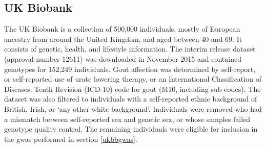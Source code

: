\documentclass[twoside,openright]{report}
\newenvironment{Shaded}{\begin{snugshade}}{\end{snugshade}}
\newcommand{\KeywordTok}[1]{\textcolor[rgb]{0.13,0.29,0.53}{\textbf{#1}}}
\newcommand{\StringTok}[1]{\textcolor[rgb]{0.31,0.60,0.02}{#1}}
\newcommand{\CommentTok}[1]{\textcolor[rgb]{0.56,0.35,0.01}{\textit{#1}}}
\newcommand{\FunctionTok}[1]{\textcolor[rgb]{0.00,0.00,0.00}{#1}}
\newcommand{\VariableTok}[1]{\textcolor[rgb]{0.00,0.00,0.00}{#1}}
\newcommand{\ExtensionTok}[1]{#1}
\newcommand{\NormalTok}[1]{#1}
\begin{document}
\begin{Shaded}
\end{Shaded}

\subsection{UK Biobank}\label{ukbbdata}

The UK Biobank is a collection of 500,000 individuals, mostly of
European ancestry from around the United Kingdom, and aged between 40
and 69. It consists of genetic, health, and lifestyle information. The
interim release dataset (approval number 12611) was downloaded in
November 2015 and contained genotypes for 152,249 individuals. Gout
affection was determined by self-report, or self-reported use of urate
lowering therapy, or an International Classification of Diseases, Tenth
Revision (ICD-10) code for gout (M10, including sub-codes). The dataset
was also filtered to individuals with a self-reported ethnic background
of British, Irish, or `any other white background'. Individuals were
removed who had a mismatch between self-reported sex and genetic sex, or
whose samples failed genotype quality control. The remaining individuals
were eligible for inclusion in the \gls{gwas} performed in section
\ref{ukbbgwas}.
\end{document}
